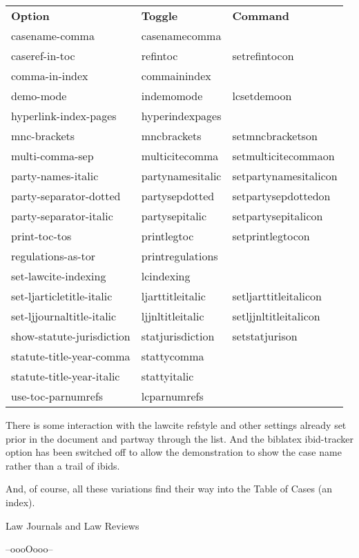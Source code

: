 \begin{tabular}{lll}
\bfseries Option & \bfseries Toggle & \bfseries Command \\ 
casename-comma & casenamecomma &  \\ 
caseref-in-toc & refintoc & setrefintocon \\ 
comma-in-index & commainindex &  \\ 
demo-mode & indemomode & lcsetdemoon \\ 
hyperlink-index-pages & hyperindexpages &  \\ 
mnc-brackets & mncbrackets & setmncbracketson \\ 
multi-comma-sep & multicitecomma & setmulticitecommaon \\ 
party-names-italic & partynamesitalic & setpartynamesitalicon \\ 
party-separator-dotted & partysepdotted & setpartysepdottedon \\ 
party-separator-italic & partysepitalic & setpartysepitalicon \\ 
print-toc-tos & printlegtoc & setprintlegtocon \\ 
regulations-as-tor & printregulations &  \\ 
set-lawcite-indexing & lcindexing &  \\ 
set-ljarticletitle-italic & ljarttitleitalic & setljarttitleitalicon \\ 
set-ljjournaltitle-italic & ljjnltitleitalic & setljjnltitleitalicon \\ 
show-statute-jurisdiction & statjurisdiction & setstatjurison \\ 
statute-title-year-comma & stattycomma &  \\ 
statute-title-year-italic & stattyitalic &  \\ 
use-toc-parnumrefs & lcparnumrefs &  \\ 
\end{tabular}

\newpage
{}
\bigskip

\p There is some interaction with the lawcite refstyle and other settings already set prior in the document and partway through the list. And the biblatex ibid-tracker option has been switched off to  allow the demonstration to show the case name rather than a trail of ibids.

\p And, of course, all these variations find their way into the Table of Cases (an index).

\newpage
\p Law Journals and Law Reviews
\bigskip

\bigskip 


\bigskip
\bigskip
\hfill --oooOooo--\hfill\ 

\printbibliography[type=book]







